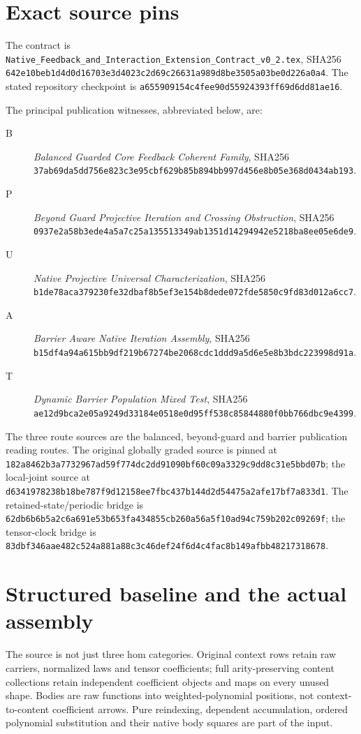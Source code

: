 \documentclass[11pt]{article}
\begin{document}
\section{Exact source pins}
The contract is \texttt{Native\_Feedback\_and\_Interaction\_Extension\_Contract\_v0\_2.tex}, SHA256
\texttt{642e10beb1d4d0d16703e3d4023c2d69c26631a989d8be3505a03be0d226a0a4}.
The stated repository checkpoint is \texttt{a655909154c4fee90d55924393ff69d6dd81ae16}.

The principal publication witnesses, abbreviated below, are:
\begin{description}
\item[B] \emph{Balanced Guarded Core Feedback Coherent Family}, SHA256
\texttt{37ab69da5dd756e823c3e95cbf629b85b894bb997d456e8b05e368d0434ab193}.
\item[P] \emph{Beyond Guard Projective Iteration and Crossing Obstruction}, SHA256
\texttt{0937e2a58b3ede4a5a7c25a135513349ab1351d14294942e5218ba8ee05e6de9}.
\item[U] \emph{Native Projective Universal Characterization}, SHA256
\texttt{b1de78aca379230fe32dbaf8b5ef3e154b8dede072fde5850c9fd83d012a6cc7}.
\item[A] \emph{Barrier Aware Native Iteration Assembly}, SHA256
\texttt{b15df4a94a615bb9df219b67274be2068cdc1ddd9a5d6e5e8b3bdc223998d91a}.
\item[T] \emph{Dynamic Barrier Population Mixed Test}, SHA256
\texttt{ae12d9bca2e05a9249d33184e0518e0d95ff538c85844880f0bb766dbc9e4399}.
\end{description}
The three route sources are the balanced, beyond-guard and barrier publication reading routes. The original globally graded source is pinned at
\texttt{182a8462b3a7732967ad59f774dc2dd91090bf60c09a3329c9dd8c31e5bbd07b};
the local-joint source at
\texttt{d6341978238b18be787f9d12158ee7fbc437b144d2d54475a2afe17bf7a833d1}.
The retained-state/periodic bridge is
\texttt{62db6b6b5a2c6a691e53b653fa434855cb260a56a5f10ad94c759b202c09269f};
the tensor-clock bridge is
\texttt{83dbf346aae482c524a881a88c3c46def24f6d4c4fac8b149afbb48217318678}.

\section{Structured baseline and the actual assembly}
The source is not just three hom categories. Original context rows retain raw carriers, normalized laws and tensor coefficients; full arity-preserving content collections retain independent coefficient objects and maps on every unused shape. Bodies are raw functions into weighted-polynomial positions, not context-to-content coefficient arrows. Pure reindexing, dependent accumulation, ordered polynomial substitution and their native body squares are part of the input.
\end{document}
